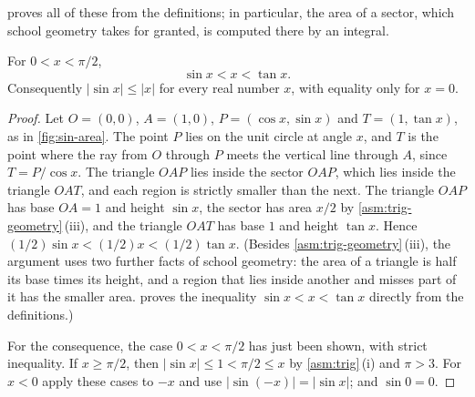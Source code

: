  proves all of these from the definitions; in particular, the area of a sector, which school geometry takes for granted, is computed there by an integral.

\begin{lemma}
\label{lem:sin-bounds}
For $0<x<\pi/2$,
\[
\sin x<x<\tan x .
\]
Consequently $|\sin x|\le|x|$ for every real number $x$, with equality only for $x=0$.
\end{lemma}

\begin{proof}
Let $O=(0,0)$, $A=(1,0)$, $P=(\cos x,\sin x)$ and $T=(1,\tan x)$, as in \cref{fig:sin-area}. The point $P$ lies on the unit circle at angle $x$, and $T$ is the point where the ray from $O$ through $P$ meets the vertical line through $A$, since $T=P/\cos x$. The triangle $OAP$ lies inside the sector $OAP$, which lies inside the triangle $OAT$, and each region is strictly smaller than the next. The triangle $OAP$ has base $OA=1$ and height $\sin x$, the sector has area $x/2$ by \cref{asm:trig-geometry}\,(iii), and the triangle $OAT$ has base $1$ and height $\tan x$. Hence $(1/2)\sin x<(1/2)x<(1/2)\tan x$. (Besides \cref{asm:trig-geometry}\,(iii), the argument uses two further facts of school geometry: the area of a triangle is half its base times its height, and a region that lies inside another and misses part of it has the smaller area.  proves the inequality $\sin x<x<\tan x$ directly from the definitions.)

For the consequence, the case $0<x<\pi/2$ has just been shown, with strict inequality. If $x\ge\pi/2$, then $|\sin x|\le1<\pi/2\le x$ by \cref{asm:trig}\,(i) and $\pi>3$. For $x<0$ apply these cases to $-x$ and use $|\sin(-x)|=|\sin x|$; and $\sin0=0$.
\end{proof}

\begin{figure}
\end{figure}

